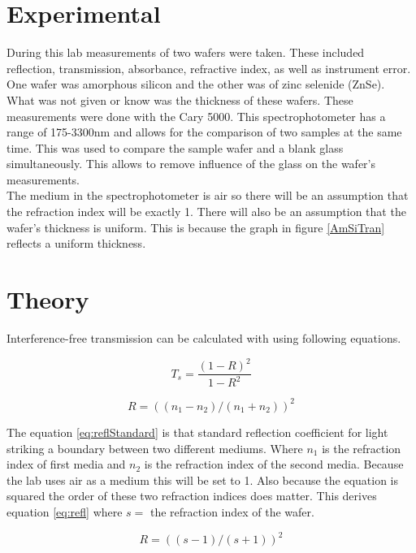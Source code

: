 \documentclass[10pt,a4paper]{article}
\begin{document}
\begin{multicols}{2}
\section*{Experimental}
During this lab measurements of two wafers were taken. These included reflection, transmission, absorbance, refractive index, as well as instrument error. One wafer was amorphous silicon and the other was of zinc selenide (ZnSe). What was not given or know was the thickness of these wafers. These measurements were done with the Cary 5000. This spectrophotometer has a range of 175-3300nm \cite{carry} and allows for the comparison of two samples at the same time. This was used to compare the sample wafer and a blank glass simultaneously. This allows to remove influence of the glass on the wafer's measurements.\\
The medium in the spectrophotometer is air so there will be an assumption that the refraction index will be exactly 1. There will also be an assumption that the wafer's thickness is uniform. This is because the graph in figure \ref{AmSiTran} reflects a uniform thickness\cite{paper}.





\section*{Theory}

Interference-free transmission can be calculated with using following equations.

\begin{equation}
\label{eq:trans}
T_s = \dfrac{(1-R)^2}{1-R^2}
\end{equation}

\begin{equation}
\label{eq:reflStandard}
R = ((n_1-n_2)/(n_1+n_2))^2
\end{equation}

The equation \ref{eq:reflStandard} is that standard reflection coefficient for light striking a boundary between two different mediums. Where $n_1$ is the refraction index of first media and $n_2$ is the refraction index of the second media. Because the lab uses air as a medium this will be set to 1. Also because the equation is squared the order of these two refraction indices does matter. This derives equation \ref{eq:refl} where $s =$ the refraction index of the wafer.

\begin{equation}
\label{eq:refl}
R = ((s-1)/(s+1))^2
\end{equation}


\end{multicols}
\end{document}

